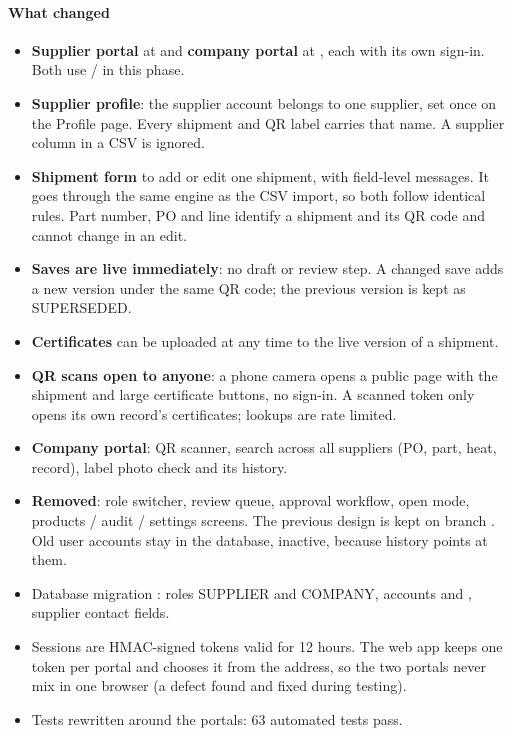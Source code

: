 \documentclass[11pt,a4paper]{article}
\begin{document}
\paragraph{What changed}
\begin{itemize}
  \item \textbf{Supplier portal} at  and \textbf{company portal} at , each with
    its own sign-in. Both use  /  in this phase.
  \item \textbf{Supplier profile}: the supplier account belongs to one supplier, set once on the Profile page. Every
    shipment and QR label carries that name. A supplier column in a CSV is ignored.
  \item \textbf{Shipment form} to add or edit one shipment, with field-level messages. It goes through the same engine
    as the CSV import, so both follow identical rules. Part number, PO and line identify a shipment and its QR code and
    cannot change in an edit.
  \item \textbf{Saves are live immediately}: no draft or review step. A changed save adds a new version under the same
    QR code; the previous version is kept as SUPERSEDED.
  \item \textbf{Certificates} can be uploaded at any time to the live version of a shipment.
  \item \textbf{QR scans open to anyone}: a phone camera opens a public page with the shipment and large certificate
    buttons, no sign-in. A scanned token only opens its own record's certificates; lookups are rate limited.
  \item \textbf{Company portal}: QR scanner, search across all suppliers (PO, part, heat, record), label photo check and
    its history.
  \item \textbf{Removed}: role switcher, review queue, approval workflow, open mode, products / audit / settings screens.
    The previous design is kept on branch . Old user accounts stay in the database,
    inactive, because history points at them.
  \item Database migration : roles SUPPLIER and COMPANY, accounts  and
    , supplier contact fields.
  \item Sessions are HMAC-signed tokens valid for 12 hours. The web app keeps one token per portal and chooses it from
    the address, so the two portals never mix in one browser (a defect found and fixed during testing).
  \item Tests rewritten around the portals: 63 automated tests pass.
\end{itemize}
\end{document}
